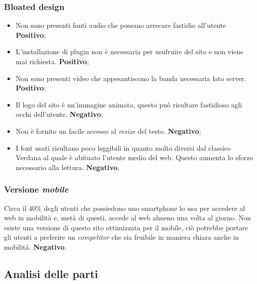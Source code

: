\documentclass[../rapporto-usabilita.tex]{subfiles}
\begin{document}
	 	\subsubsection{Bloated design}
	 	
			\begin{itemize}
	 		\item Non sono presenti fonti audio che possano arrecare fastidio all'utente \textbf{Positivo};
	 		
	 		\item L'installazione di plugin non è necessaria per usufruire del sito e non viene mai richiesta. \textbf{Positivo};
	 		
	 		\item Non sono presenti video che appesantiscono la banda necessaria lato server. \textbf{Positivo};
	 		
	 		\item Il logo del sito è un'immagine animata, questo può risultare fastidioso agli occhi dell'utente. \textbf{Negativo};
	 		
	 		\item Non è fornito un facile accesso al \textit{resize} del testo. \textbf{Negativo};
	 		
	 		\item I font usati risultano poco leggibili in quanto molto diversi dal classico Verdana al quale è abituato l'utente medio del web. Questo aumenta lo sforzo necessario alla lettura. \textbf{Negativo}.
	 	
	 	\end{itemize}
	 	
	 \subsubsection{Versione \textit{mobile}}
	 
	 	Circa il 40\% degli utenti che possiedono uno smartphone lo usa per accedere al web in mobilità e, metà di questi, accede al web almeno una volta al giorno.
	 	Non esiste una versione di questo sito ottimizzata per il mobile, ciò potrebbe portare gli utenti a preferire un \textit{competitor} che sia fruibile in maniera chiara anche in mobilità. \textbf{Negativo}.
	 	
	 \newpage
	 	
	
	\subsection{Analisi delle parti}
	\label{sec:analisiparti}
	
\end{document}
